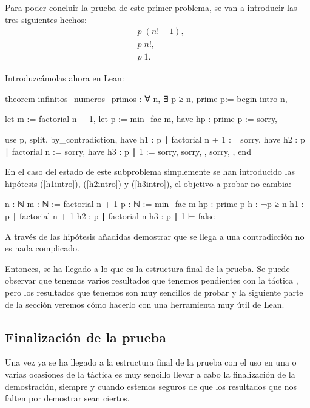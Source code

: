 Para poder concluir la prueba de este primer problema, se van a introducir
las tres siguientes hechos:
\begin{align}
  &p | (n!+1),\tag{h1}\label{h1intro}\\
  &p | n!,    \tag{h2}\label{h2intro}\\
  &p | 1.     \tag{h3}\label{h3intro}
\end{align}

Introduzcámolas ahora en Lean:
\begin{leancode}
theorem infinitos_numeros_primos : ∀ n, ∃ p ≥ n, prime p:=
begin
  intro n,

  let m := factorial n + 1,
  let p := min_fac m,
  have hp : prime p := sorry,

  use p,
  split,
  { by_contradiction,
    have h1 : p ∣ factorial n + 1 := sorry,
    have h2 : p ∣ factorial n := sorry,
    have h3 : p ∣ 1 := sorry,
    sorry, },
  { sorry, },
end
\end{leancode}

En el caso del estado de este subproblema simplemente se han introducido las
hipótesis (\ref{h1intro}), (\ref{h2intro}) y (\ref{h3intro}), el objetivo a
probar no cambia:
\begin{leancode}
n : ℕ
m : ℕ := factorial n + 1
p : ℕ := min_fac m
hp : prime p
h : ¬p ≥ n
h1 : p ∣ factorial n + 1
h2 : p ∣ factorial n
h3 : p ∣ 1
⊢ false
\end{leancode}

A través de las hipótesis añadidas demostrar que se llega a una
contradicción no es nada complicado.

Entonces, se ha llegado a lo que es la estructura final de la prueba. Se
puede observar que tenemos varios resultados que tenemos pendientes con
la táctica , pero los resultados que tenemos son
muy sencillos de probar y la siguiente parte de la sección veremos cómo
hacerlo con una herramienta muy útil de Lean.

\subsection{Finalización de la prueba}

Una vez ya se ha llegado a la estructura final de la prueba con el uso
en una o varias ocasiones de la táctica  es muy
sencillo llevar a cabo la finalización de la demostración, siempre y
cuando estemos seguros de que los resultados que nos falten por
demostrar sean ciertos.

